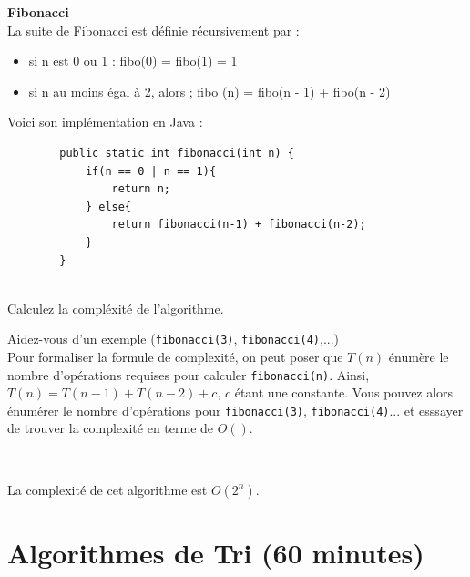 \begin{Exercice} [10 minutes] \textbf{Fibonacci} \\

La suite de Fibonacci est définie récursivement par :
\begin{itemize}
    \item si n est 0 ou 1 : fibo(0) = fibo(1) = 1
    \item si n au moins égal à 2, alors ; fibo (n) = fibo(n - 1) + fibo(n - 2)
\end{itemize}

Voici son implémentation en Java :

\begin{verbatim}
        public static int fibonacci(int n) {
            if(n == 0 | n == 1){
                return n;
            } else{
                return fibonacci(n-1) + fibonacci(n-2);
            }
        }
        
\end{verbatim}

Calculez la compléxité de l'algorithme.

\begin{conseil}
Aidez-vous d'un exemple (\lstinline{fibonacci(3)}, \lstinline{fibonacci(4)},...) \\
Pour formaliser la formule de complexité, on peut poser que $T(n)$ énumère le nombre d'opérations requises pour calculer \lstinline{fibonacci(n)}. Ainsi, $T(n) = T(n-1) + T(n-2) + c$, $c$ étant une constante. Vous pouvez alors énumérer le nombre d'opérations pour \lstinline{fibonacci(3)}, \lstinline{fibonacci(4)}... et esssayer de trouver la complexité en terme de $O()$.
\end{conseil}
\ \\

\begin{Solutions}
    La complexité de cet algorithme est $O(2^n)$.
\end{Solutions}
\end{Exercice}

\section{Algorithmes de Tri (60 minutes)}

